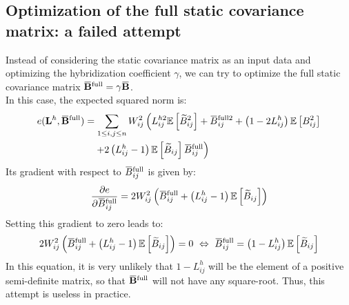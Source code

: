 \documentclass[12pt]{scrartcl}
\newcommand{\overbar}[1]{\mkern 1.5mu\overline{\mkern-1.5mu#1\mkern-1.5mu}\mkern 1.5mu}
\begin{document}
\subsection{Optimization of the full static covariance matrix: a failed attempt}
Instead of considering the static covariance matrix as an input data and optimizing the hybridization coefficient $\gamma$, we can try to optimize the full static covariance matrix $\overbar{\mathbf{B}}^\mathrm{full} = \gamma \overbar{\mathbf{B}}$.\\
$  $\\
In this case, the expected squared norm is:
\begin{align}
e(\mathbf{L}^h,\overbar{\mathbf{B}}^\mathrm{full}) & = \sum_{1 \le i,j \le n} W_{ij}^2 \left(L^{h2}_{ij} \mathbb{E} \left[\widetilde{B}_{ij}^2\right] + \overbar{B}^{\mathrm{full}2}_{ij} + \left(1 - 2 L^h_{ij}\right) \mathbb{E} \left[B^2_{ij}\right] \right. \nonumber \\
& \left. \quad + 2 \left(L^h_{ij} - 1\right)  \mathbb{E} \left[\widetilde{B}_{ij}\right] \overbar{B}^\mathrm{full}_{ij} \right)
\end{align}
Its gradient with respect to $\overbar{B}^\mathrm{full}_{ij}$ is given by:
\begin{align}
\frac{\partial e}{\partial \overbar{B}^\mathrm{full}_{ij}} = 2 W_{ij}^2 \left(\overbar{B}^\mathrm{full}_{ij} + \left(L^h_{ij} - 1\right) \mathbb{E} \left[\widetilde{B}_{ij}\right]\right)
\end{align}
Setting this gradient to zero leads to:
\begin{align}
2 W_{ij}^2 \left(\overbar{B}^\mathrm{full}_{ij} + \left(L^h_{ij} - 1\right) \mathbb{E} \left[\widetilde{B}_{ij}\right] \right) = 0 \ \Leftrightarrow \ \overbar{B}^\mathrm{full}_{ij} = \left(1 - L^h_{ij}\right) \mathbb{E}\left[ \widetilde{B}_{ij}\right] 
\end{align}
In this equation, it is very unlikely that $1 - L^h_{ij}$ will be the element of a positive semi-definite matrix, so that $\overbar{\mathbf{B}}^\mathrm{full}$ will not have any square-root. Thus, this attempt is useless in practice.
\end{document}
